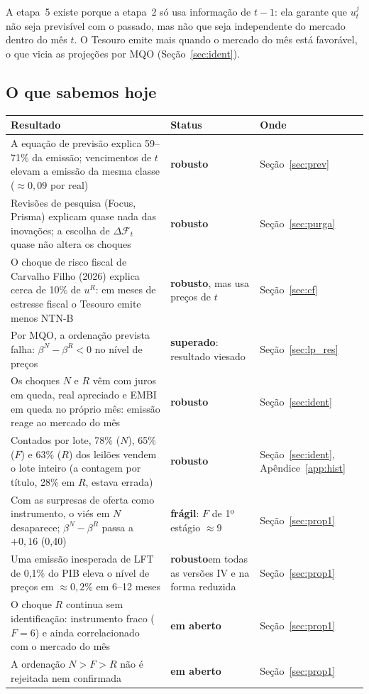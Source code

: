 \documentclass[12pt,a4paper]{article}
\newcommand{\robusto}{\textcolor{green!45!black}{\textbf{robusto}}}
\newcommand{\fragil}{\textcolor{orange!85!black}{\textbf{frágil}}}
\newcommand{\superado}{\textcolor{red!70!black}{\textbf{superado}}}
\newcommand{\aberto}{\textcolor{blue!70!black}{\textbf{em aberto}}}
\begin{document}
A etapa~5 existe porque a etapa~2 só usa informação de \(t-1\): ela garante que
\(u_t^j\) não seja previsível com o passado, mas não que seja independente do
mercado dentro do mês \(t\). O Tesouro emite mais quando o mercado do mês está
favorável, o que vicia as projeções por MQO (Seção~\ref{sec:ident}).

\subsection{O que sabemos hoje}

\begin{center}
\small
\begin{longtable}{p{}p{}p{}}
\toprule
Resultado & Status & Onde \\
\midrule
\endhead
A equação de previsão explica 59--71\% da emissão; vencimentos de \(t\) elevam a
emissão da mesma classe (\(\approx 0{,}09\) por real) & \robusto &
Seção~\ref{sec:prev} \\
Revisões de pesquisa (Focus, Prisma) explicam quase nada das inovações; a escolha
de \(\Delta\mathcal{F}_t\) quase não altera os choques & \robusto &
Seção~\ref{sec:purga} \\
O choque de risco fiscal de Carvalho Filho (2026) explica cerca de 10\% de \(u^R\):
em meses de estresse fiscal o Tesouro emite menos NTN-B & \robusto, mas usa preços
de \(t\) & Seção~\ref{sec:cf} \\
Por MQO, a ordenação prevista falha: \(\beta^N-\beta^R<0\) no nível de preços &
\superado: resultado viesado & Seção~\ref{sec:lp_res} \\
Os choques \(N\) e \(R\) vêm com juros em queda, real apreciado e EMBI em queda no
próprio mês: emissão reage ao mercado do mês & \robusto & Seção~\ref{sec:ident} \\
Contados por lote, 78\% (\(N\)), 65\% (\(F\)) e 63\% (\(R\)) dos leilões vendem o
lote inteiro (a contagem por título, 28\% em \(R\), estava errada) & \robusto &
Seção~\ref{sec:ident}, Apêndice~\ref{app:hist} \\
Com as surpresas de oferta como instrumento, o viés em \(N\) desaparece;
\(\beta^N-\beta^R\) passa a \(+0{,}16\) (0,40) & \fragil: \(F\) de 1º estágio
\(\approx 9\) & Seção~\ref{sec:prop1} \\
Uma emissão inesperada de LFT de 0,1\% do PIB eleva o nível de preços em
\(\approx 0{,}2\%\) em 6--12 meses & \robusto em todas as versões IV e na forma
reduzida & Seção~\ref{sec:prop1} \\
O choque \(R\) continua sem identificação: instrumento fraco (\(F=6\)) e
ainda correlacionado com o mercado do mês & \aberto & Seção~\ref{sec:prop1} \\
A ordenação \(N>F>R\) não é rejeitada nem confirmada & \aberto & Seção~\ref{sec:prop1} \\
\bottomrule
\end{longtable}
\end{center}
\end{document}
